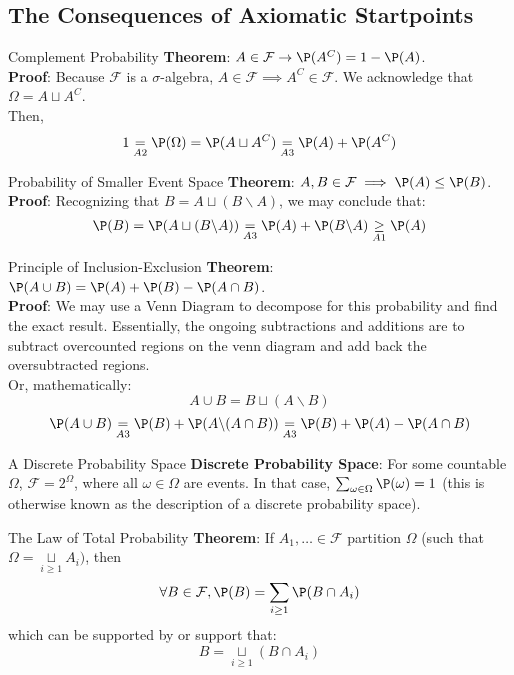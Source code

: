 \subsection{The Consequences of Axiomatic Startpoints}
\begin{ln-theorem}{Complement Probability}{}
    \textbf{Theorem}: $A \in \mathcal{F} \rightarrow \P(A^C) = 1 - \P(A)$. \\
    \tcblower
    \textbf{Proof}: Because $\mathcal{F}$ is a $\sigma$-algebra, $A \in \mathcal{F} \implies A^C \in \mathcal{F}$.
    We acknowledge that $\Omega = A \sqcup A^C$. \\
    Then,
    \[1 \underset{A2}{=} \P(\Omega) = \P(A \sqcup A^C) \underset{A3}{=} \P(A) + \P(A^C)\]
\end{ln-theorem}
\begin{ln-theorem}{Probability of Smaller Event Space}{}
    \textbf{Theorem}: $A, B \in \mathcal{F} \implies \P(A) \leq \P(B)$. \\
    \tcblower
    \textbf{Proof}: Recognizing that $B = A \sqcup (B \backslash A)$, we may conclude that:
    \[\P(B) = \P(A \sqcup (B \backslash A)) \underset{A3}{=} \P(A) + \P(B \backslash A) \underset{A1}{\geq} \P(A)\]
\end{ln-theorem}
\begin{ln-theorem}{Principle of Inclusion-Exclusion}{}
    \textbf{Theorem}: $\P(A \cup B) = \P(A) + \P(B) - \P(A \cap B)$. \\
    \tcblower
    \textbf{Proof}: We may use a Venn Diagram to decompose for this probability and find the exact result.
    Essentially, the ongoing subtractions and additions are to subtract overcounted regions on the venn diagram and add back the oversubtracted regions. \\
    Or, mathematically:
    \[A \cup B = B \sqcup (A \backslash B)\]
    \[\P(A \cup B) \underset{A3}{=} \P(B) + \P(A \backslash (A \cap B)) \underset{A3}{=} \P(B) + \P(A) - \P(A \cap B)\]
\end{ln-theorem}
\begin{ln-theorem}{A Discrete Probability Space}{}
    \textbf{Discrete Probability Space}: For some countable $\Omega$, $\mathcal{F} = 2^\Omega$, where all $\omega \in \Omega$ are events.
    In that case, $\sum_{\omega \in \Omega} \P(\omega) = 1$ (this is otherwise known as the description of a discrete probability space).
\end{ln-theorem}
\begin{ln-theorem}{The Law of Total Probability}{}
    \textbf{Theorem}: If $A_1, \dots \in \mathcal{F}$ partition $\Omega$ (such that $\Omega = \underset{i \geq 1}{\sqcup} A_i)$, then
    \[\forall B \in \mathcal{F}, \P(B) = \sum_{i \geq 1} \P(B \cap A_i)\]
    which can be supported by or support that:
    \[B = \underset{i \geq 1}{\sqcup} (B \cap A_i)\]
\end{ln-theorem}


